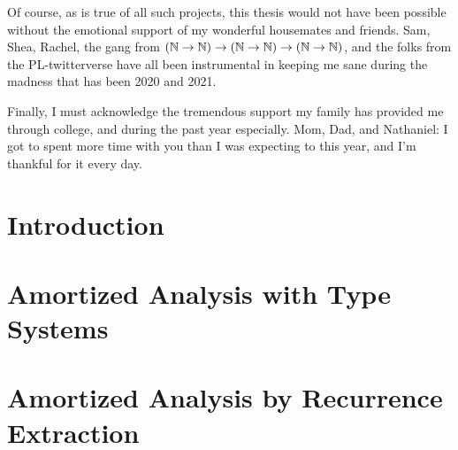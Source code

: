 \documentclass[final]{westhesis}
\begin{document}
\begin{acknowledgements}
Of course, as is true of all such projects, this thesis would not have been possible without the emotional support of my wonderful housemates and friends. Sam, Shea, Rachel, the gang from $(\mathbb{N} \to \mathbb{N}) \to (\mathbb{N} \to \mathbb{N}) \to (\mathbb{N} \to \mathbb{N})$, and the folks from the PL-twitterverse have all been instrumental in keeping me sane during the madness that has been 2020 and 2021.

Finally, I must acknowledge the tremendous support my family has provided me through college, and during the past year especially. Mom, Dad, and Nathaniel: I got to spent more time with you than I was expecting to this year, and I'm thankful for it every day.
\end{acknowledgements}


\frontmatter
\maketitle
\makededication
\makeack
\tableofcontents
\mainmatter


\chapter{Introduction}
\label{ch:intro}
%

\chapter{Amortized Analysis with Type Systems}
\label{ch:lambda-amor}



\chapter{Amortized Analysis by Recurrence Extraction}
\label{ch:rec-extr}
%




\appendix
\renewcommand\chaptername{Appendix}

\chapter{}
\label{appendix:a}


\chapter{}
\label{appendix:b}
%
\end{document}
